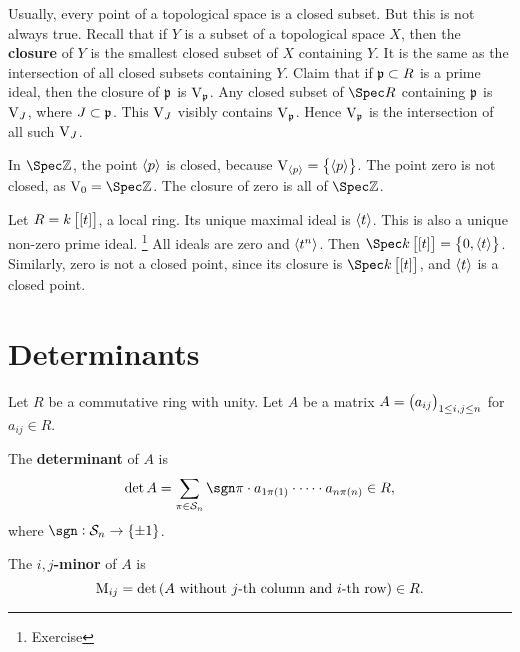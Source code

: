 Usually, every point of a topological space is a closed subset. But this is not always true. Recall that if $ Y $ is a subset of a topological space $ X $, then the \textbf{closure} of $ Y $ is the smallest closed subset of $ X $ containing $ Y $. It is the same as the intersection of all closed subsets containing $ Y $. Claim that if $ \mathfrak{p} \subset R $ is a prime ideal, then the closure of $ \mathfrak{p} $ is $ \mathrm{V}_{\mathfrak{p}} $. Any closed subset of $ \Spec R $ containing $ \mathfrak{p} $ is $ \mathrm{V}_J $, where $ J \subset \mathfrak{p} $. This $ \mathrm{V}_J $ visibly contains $ \mathrm{V}_{\mathfrak{p}} $. Hence $ \mathrm{V}_{\mathfrak{p}} $ is the intersection of all such $ \mathrm{V}_J $.

\begin{example*}
In $ \Spec \ZZ $, the point $ \left\langle p \right\rangle $ is closed, because $ \V_{\abr{p}} = \cbr{\abr{p}} $. The point zero is not closed, as $ \V_{0} = \Spec \ZZ $. The closure of zero is all of $ \Spec \ZZ $.
\end{example*}

\begin{example*}
Let $ R = k\sbr{\sbr{t}} $, a local ring. Its unique maximal ideal is $ \left\langle t \right\rangle $. This is also a unique non-zero prime ideal. \footnote{Exercise} All ideals are zero and $ \left\langle t^n \right\rangle $. Then $ \Spec k\sbr{\sbr{t}} = \cbr{0, \abr{t}} $. Similarly, zero is not a closed point, since its closure is $ \Spec k\sbr{\sbr{t}} $, and $ \left\langle t \right\rangle $ is a closed point.
\end{example*}

\pagebreak

\section{Determinants}


Let $ R $ be a commutative ring with unity. Let $ A $ be a matrix $ A = \br{a_{ij}}_{1 \le i, j \le n} $ for $ a_{ij} \in R $.

\begin{definition}
The \textbf{determinant} of $ A $ is
$$ \det A = \sum_{\pi \in \SSS_n} \sgn \pi \cdot a_{1\pi\br{1}} \cdot \dots \cdot a_{n\pi\br{n}} \in R, $$
where $ \sgn : \SSS_n \to \cbr{\pm 1} $.
\end{definition}

\begin{definition}
The \textbf{$ i, j $-minor} of $ A $ is
$$ \M_{ij} = \det\br{A \ \text{without $ j $-th column and $ i $-th row}} \in R. $$
\end{definition}


